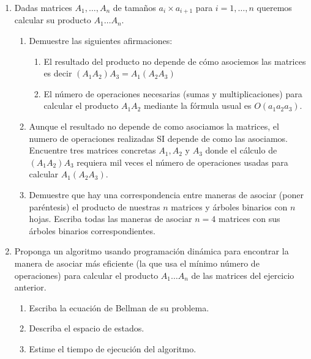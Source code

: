 \documentclass[12pt, a4paper]{article}
\begin{document}
\begin{enumerate}
\item Dadas matrices $A_1,\dots, A_n$ de tama\~nos $a_i\times a_{i+1}$ para $i=1,\dots,n$ queremos calcular su producto $A_1\dots A_n$.
\begin{enumerate}
\item Demuestre las siguientes afirmaciones:\begin{enumerate}
\item  El resultado del producto no depende de cómo asociemos las matrices es decir $(A_1A_2)A_3=A_1(A_2A_3)$
\item El n\'umero de operaciones necesarias (sumas y multiplicaciones) para calcular el producto $A_1A_2$ mediante la fórmula usual es $O(a_1a_2a_3)$.
\end{enumerate}
\item Aunque el resultado no depende de como asociamos la matrices, el numero de operaciones realizadas SI depende de como las asociamos. Encuentre tres matrices concretas $A_1,A_2$ y $A_3$ donde el cálculo de $(A_1A_2)A_3$ requiera mil veces el número de operaciones usadas para calcular $A_1(A_2A_3)$. 
\item Demuestre que hay una correspondencia entre maneras de asociar (poner paréntesis) el producto de nuestras $n$ matrices y árboles binarios con $n$ hojas. Escriba todas las maneras de asociar $n=4$ matrices con sus árboles binarios correspondientes.
\end{enumerate}

\item Proponga un algoritmo usando programación dinámica para encontrar la manera de asociar más eficiente (la que usa el mínimo número de operaciones) para calcular el producto $A_1\dots A_n$ de las matrices del ejercicio anterior.
\begin{enumerate}
\item Escriba la ecuación de Bellman de su problema.
\item Describa el espacio de estados.
\item Estime el tiempo de ejecución del algoritmo.
\end{enumerate}


\end{enumerate}
\end{document}

